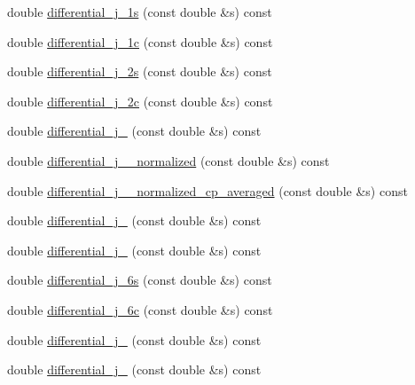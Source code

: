 \begin{DoxyCompactItemize}
\item 
double \hyperlink{classeos_1_1BToKstarDilepton_3_01LowRecoil_01_4_a0342369281e512ea597742dd8153ea21}{differential\_\-j\_\-1s} (const double \&s) const 
\item 
double \hyperlink{classeos_1_1BToKstarDilepton_3_01LowRecoil_01_4_a0faec7b18929938598e17c28e10dfc0f}{differential\_\-j\_\-1c} (const double \&s) const 
\item 
double \hyperlink{classeos_1_1BToKstarDilepton_3_01LowRecoil_01_4_aa081a01d3c5d25da1f843f5257c6ebed}{differential\_\-j\_\-2s} (const double \&s) const 
\item 
double \hyperlink{classeos_1_1BToKstarDilepton_3_01LowRecoil_01_4_a057c2fc7b6325fc5b59fef42e6889475}{differential\_\-j\_\-2c} (const double \&s) const 
\item 
double \hyperlink{classeos_1_1BToKstarDilepton_3_01LowRecoil_01_4_ab90c395a48f549a907b031b4ed99859a}{differential\_\-j\_} (const double \&s) const 
\item 
double \hyperlink{classeos_1_1BToKstarDilepton_3_01LowRecoil_01_4_a5d96a91b2cc74a2c0dd03f3778e710b5}{differential\_\-j\_\_\-normalized} (const double \&s) const 
\item 
double \hyperlink{classeos_1_1BToKstarDilepton_3_01LowRecoil_01_4_a7d234ea02e55215cc759477c729a1d8b}{differential\_\-j\_\_\-normalized\_\-cp\_\-averaged} (const double \&s) const 
\item 
double \hyperlink{classeos_1_1BToKstarDilepton_3_01LowRecoil_01_4_a60ca686c439ac218accdbb4392d77625}{differential\_\-j\_} (const double \&s) const 
\item 
double \hyperlink{classeos_1_1BToKstarDilepton_3_01LowRecoil_01_4_aadceae1d69db5224363405492646c1cb}{differential\_\-j\_} (const double \&s) const 
\item 
double \hyperlink{classeos_1_1BToKstarDilepton_3_01LowRecoil_01_4_a116a974d7a73dfd824a5db577be587d0}{differential\_\-j\_\-6s} (const double \&s) const 
\item 
double \hyperlink{classeos_1_1BToKstarDilepton_3_01LowRecoil_01_4_aeca2c64c5e838bd43005e5fae10e1f1e}{differential\_\-j\_\-6c} (const double \&s) const 
\item 
double \hyperlink{classeos_1_1BToKstarDilepton_3_01LowRecoil_01_4_af9c010692e073ba24e8f13b0638f6a8d}{differential\_\-j\_} (const double \&s) const 
\item 
double \hyperlink{classeos_1_1BToKstarDilepton_3_01LowRecoil_01_4_a4dfeb8398e18c95f106707aac6c543af}{differential\_\-j\_} (const double \&s) const 

\end{DoxyCompactItemize}
